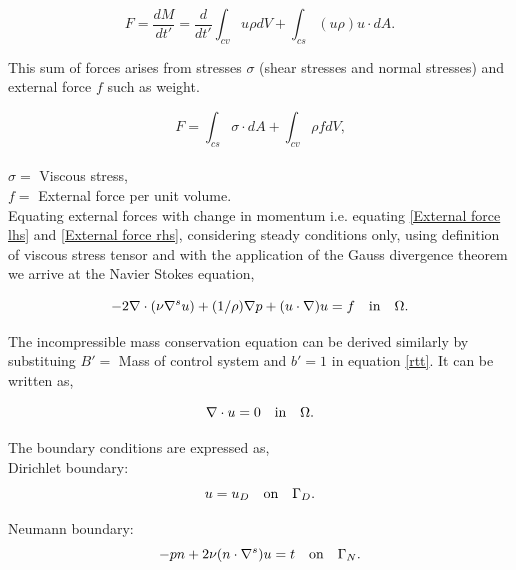 \documentclass[a4paper,oneside,openright,spanish,english]{book}
\begin{document}
\begin{equation}\label{External force lhs}
F = \frac{dM}{dt'} = \frac{d}{dt'} \int_{cv} u \rho dV + \int_{cs} (u \rho) u\cdot dA \textrm{.}
\end{equation}

This sum of forces arises from stresses $\sigma$ (shear stresses and normal stresses) and external force $f$ such as weight. 

\begin{equation}\label{External force rhs}
F = \int_{cs} \sigma \cdot dA + \int_{cv} \rho f dV \textrm{,}
\end{equation}
\\
$\sigma =$ Viscous stress,\\
$f =$ External force per unit volume.\\

Equating external forces with change in momentum i.e. equating \eqref{External force lhs} and \eqref{External force rhs}, considering steady conditions only, using definition of viscous stress tensor and with the application of the Gauss divergence theorem we arrive at the Navier Stokes equation,

\begin{equation} \label{navier_stokes}
-2\nabla \cdot (\nu \nabla^s u) + (1/\rho) \nabla p + (u \cdot \nabla)u = f \quad   \textnormal{in}  \quad \Omega \textrm{.}
\end{equation} 

The incompressible mass conservation equation can be derived similarly by substituing $B' =$ Mass of control system and $b' = 1$ in equation \eqref{rtt}.  It can be written as,

\begin{equation}\label{mass_conservation}
\nabla \cdot u=0 \quad   \textnormal{in}  \quad \Omega \textrm{.}
\end{equation}

The boundary conditions are expressed as,\\

Dirichlet boundary:
\begin{equation}\label{dirichlet_ns}
u=u_D \quad \textnormal{on} \quad \Gamma_D \textrm{.}
\end{equation}

Neumann boundary:
\begin{equation} \label{neumann_ns}
-pn + 2\nu(n \cdot \nabla^s)u = t \quad   \textnormal{on}  \quad \Gamma_N \textrm{.}
\end{equation}
\end{document}
